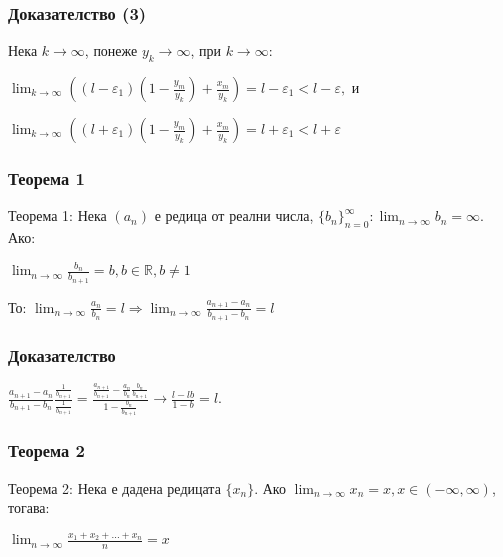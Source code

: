 \documentclass[12pt]{beamer}
\begin{document}
\begin{frame}
\frametitle{Доказателство (3)}
\begin{block}
{}
Нека \(k \to \infty\), понеже \(y_k \to \infty\), при \(k \to \infty\):
\begin{center}
\(
    \displaystyle\lim_{k \to \infty}((l - \varepsilon_1)(1 - \frac{y_m}{y_k}) + \frac{x_m}{y_k}) = l - \varepsilon_1 < l - \varepsilon,
\)
и
\end{center}
\begin{center}
\(
    \displaystyle\lim_{k \to \infty}((l + \varepsilon_1)(1 - \frac{y_m}{y_k}) + \frac{x_m}{y_k}) = l + \varepsilon_1 < l + \varepsilon
\)
\end{center}
\end{block}
\end{frame}

\begin{frame}
\frametitle{Теорема 1}
\begin{block}
{Теорема 1:}
Нека \((a_n)\) е редица от реални числа, \(\displaystyle\{b_n\}_{n=0}^\infty: \lim_{n \to \infty} b_n = \infty\). Ако:
\begin{center}
\(
    \displaystyle\lim_{n \to \infty}\frac{b_n}{b_{n+1}} = b, b \in \mathbb R, b \neq 1
\)
\end{center}
То: \(\displaystyle\lim_{n \to \infty}\frac{a_n}{b_n} = l \Rightarrow \lim_{n \to \infty}\frac{a_{n+1} - a_n}{b_{n+1} - b_n} = l \)
\end{block}
\end{frame}

\begin{frame}
\frametitle{Доказателство}
\begin{block}
{}
\begin{center}
\(
    \displaystyle\frac{a_{n + 1} - a_n}{b_{n+1} - b_n} \frac{\frac{1}{b_{n+1}}}{\frac{1}{b_{n+1}}} = \frac{\frac{a_{n+1}}{b_{n+1}} - \frac{a_n}{b_n}\frac{b_n}{b_{n+1}}}{1 - \frac{b_n}{b_{n+1}}}
    \to
    \frac{l - lb}{1 - b} = l.
\)
\end{center}
\end{block}
\end{frame}

\begin{frame}
\frametitle{Теорема 2}
\begin{block}
{Теорема 2:}
Нека е дадена редицата \(\{x_n\}\). Ако \(\displaystyle\lim_{n \to \infty} x_n = x, x \in (-\infty, \infty)\), тогава:
\begin{center}
\(
    \displaystyle\lim_{n \to \infty} \frac{x_1 + x_2 + ... + x_n}{n} = x
\)
\end{center}
\end{block}
\end{frame}
\end{document}
